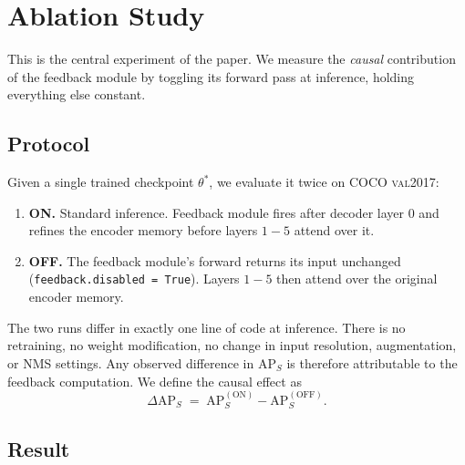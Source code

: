 \section{Ablation Study}
\label{sec:ablation}

This is the central experiment of the paper. We measure the \emph{causal} contribution of the feedback module by toggling its forward pass at inference, holding everything else constant.

\subsection{Protocol}

Given a single trained checkpoint $\theta^*$, we evaluate it twice on COCO \textsc{val2017}:

\begin{enumerate}
    \item \textbf{ON.} Standard inference. Feedback module fires after decoder layer $0$ and refines the encoder memory before layers $1{-}5$ attend over it.
    \item \textbf{OFF.} The feedback module's forward returns its input unchanged (\texttt{feedback.disabled = True}). Layers $1{-}5$ then attend over the original encoder memory.
\end{enumerate}

The two runs differ in exactly one line of code at inference. There is no retraining, no weight modification, no change in input resolution, augmentation, or NMS settings. Any observed difference in $\mathrm{AP}_S$ is therefore attributable to the feedback computation. We define the causal effect as
\begin{equation*}
    \Delta\mathrm{AP}_S \;=\; \mathrm{AP}_S^{(\mathrm{ON})} - \mathrm{AP}_S^{(\mathrm{OFF})}.
\end{equation*}

\subsection{Result}

